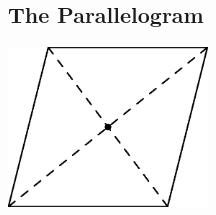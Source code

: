 \subsection{The Parallelogram}

	\begin{center}
		\includegraphics[width=150pt]{ChapterGeom/Figures/parallel.eps}
	\end{center}

